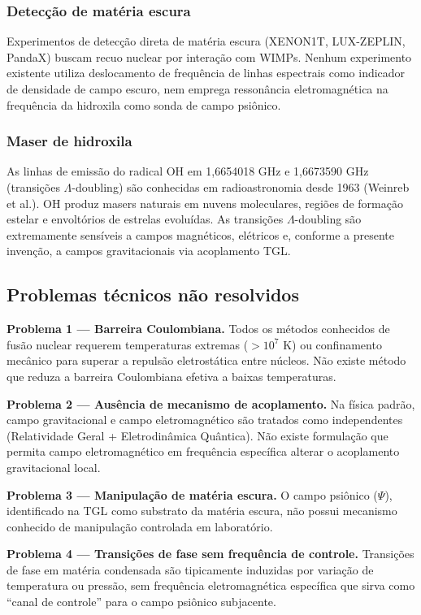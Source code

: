 \documentclass[12pt,a4paper]{article}
\begin{document}
\subsubsection{Detecção de matéria escura}

Experimentos de detecção direta de matéria escura (XENON1T,
LUX-ZEPLIN, PandaX) buscam recuo nuclear por interação com
WIMPs. Nenhum experimento existente utiliza deslocamento de
frequência de linhas espectrais como indicador de densidade
de campo escuro, nem emprega ressonância eletromagnética
na frequência da hidroxila como sonda de campo psiônico.

\subsubsection{Maser de hidroxila}

As linhas de emissão do radical OH em 1,6654018 GHz e
1,6673590 GHz (transições $\Lambda$-doubling) são conhecidas
em radioastronomia desde 1963 (Weinreb et al.). OH produz
masers naturais em nuvens moleculares, regiões de formação
estelar e envoltórios de estrelas evoluídas. As transições
$\Lambda$-doubling são extremamente sensíveis a campos
magnéticos, elétricos e, conforme a presente invenção, a
campos gravitacionais via acoplamento TGL.

\subsection{Problemas técnicos não resolvidos}

\textbf{Problema 1 --- Barreira Coulombiana.} Todos os métodos
conhecidos de fusão nuclear requerem temperaturas extremas
($>10^7$ K) ou confinamento mecânico para superar a repulsão
eletrostática entre núcleos. Não existe método que reduza a
barreira Coulombiana efetiva a baixas temperaturas.

\textbf{Problema 2 --- Ausência de mecanismo de acoplamento.}
Na física padrão, campo gravitacional e campo eletromagnético
são tratados como independentes (Relatividade Geral +
Eletrodinâmica Quântica). Não existe formulação que permita
campo eletromagnético em frequência específica alterar o
acoplamento gravitacional local.

\textbf{Problema 3 --- Manipulação de matéria escura.} O campo
psiônico ($\Psi$), identificado na TGL como substrato da
matéria escura, não possui mecanismo conhecido de manipulação
controlada em laboratório.

\textbf{Problema 4 --- Transições de fase sem frequência
de controle.} Transições de fase em matéria condensada são
tipicamente induzidas por variação de temperatura ou pressão,
sem frequência eletromagnética específica que sirva como
``canal de controle'' para o campo psiônico subjacente.
\end{document}
